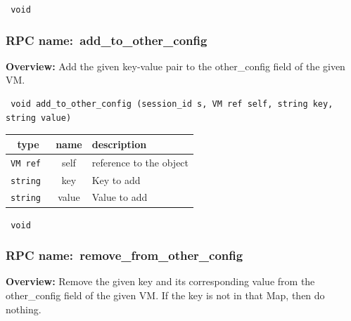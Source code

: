 \vspace{0.3cm}

{\tt 
void
}



\vspace{0.3cm}
\vspace{0.3cm}
\vspace{0.3cm}
\subsubsection{RPC name:~add\_to\_other\_config}

{\bf Overview:} 
Add the given key-value pair to the other\_config field of the given VM.

\begin{verbatim} void add_to_other_config (session_id s, VM ref self, string key, string value)\end{verbatim}



 
\vspace{0.3cm}
\begin{tabular}{|c|c|p{7cm}|}
 \hline
{\bf type} & {\bf name} & {\bf description} \\ \hline
{\tt VM ref } & self & reference to the object \\ \hline 

{\tt string } & key & Key to add \\ \hline 

{\tt string } & value & Value to add \\ \hline 

\end{tabular}

\vspace{0.3cm}

{\tt 
void
}



\vspace{0.3cm}
\vspace{0.3cm}
\vspace{0.3cm}
\subsubsection{RPC name:~remove\_from\_other\_config}

{\bf Overview:} 
Remove the given key and its corresponding value from the other\_config
field of the given VM.  If the key is not in that Map, then do nothing.


